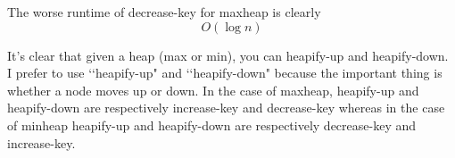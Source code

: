 The worse runtime of decrease-key for maxheap is clearly
\[
O(\log n)
\]

It's clear that given a heap (max or min), 
you can heapify-up and heapify-down.
I prefer to use 
\lq\lq heapify-up"
and 
\lq\lq heapify-down"
because the important thing is whether a node moves up or down.
In the case of maxheap, 
heapify-up and heapify-down
are respectively
increase-key and decrease-key
whereas
in the case of minheap
heapify-up and heapify-down
are respectively
decrease-key and increase-key.







